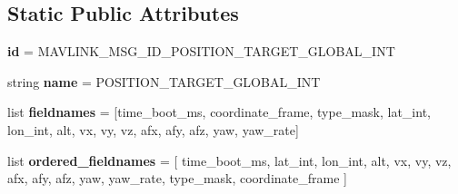 \subsection*{Static Public Attributes}
\begin{DoxyCompactItemize}
\item 
\mbox{\label{classpymavlink_1_1dialects_1_1v10_1_1MAVLink__position__target__global__int__message_ae9acef48dafa050f1e1c30083a66b1fe}} 
{\bfseries id} = M\+A\+V\+L\+I\+N\+K\+\_\+\+M\+S\+G\+\_\+\+I\+D\+\_\+\+P\+O\+S\+I\+T\+I\+O\+N\+\_\+\+T\+A\+R\+G\+E\+T\+\_\+\+G\+L\+O\+B\+A\+L\+\_\+\+I\+NT
\item 
\mbox{\label{classpymavlink_1_1dialects_1_1v10_1_1MAVLink__position__target__global__int__message_a5bde63744b3b0bd60b0f2aee91095310}} 
string {\bfseries name} = \textquotesingle{}P\+O\+S\+I\+T\+I\+O\+N\+\_\+\+T\+A\+R\+G\+E\+T\+\_\+\+G\+L\+O\+B\+A\+L\+\_\+\+I\+NT\textquotesingle{}
\item 
\mbox{\label{classpymavlink_1_1dialects_1_1v10_1_1MAVLink__position__target__global__int__message_a46365cd2740889bef3ba31401360df35}} 
list {\bfseries fieldnames} = \mbox{[}\textquotesingle{}time\+\_\+boot\+\_\+ms\textquotesingle{}, \textquotesingle{}coordinate\+\_\+frame\textquotesingle{}, \textquotesingle{}type\+\_\+mask\textquotesingle{}, \textquotesingle{}lat\+\_\+int\textquotesingle{}, \textquotesingle{}lon\+\_\+int\textquotesingle{}, \textquotesingle{}alt\textquotesingle{}, \textquotesingle{}vx\textquotesingle{}, \textquotesingle{}vy\textquotesingle{}, \textquotesingle{}vz\textquotesingle{}, \textquotesingle{}afx\textquotesingle{}, \textquotesingle{}afy\textquotesingle{}, \textquotesingle{}afz\textquotesingle{}, \textquotesingle{}yaw\textquotesingle{}, \textquotesingle{}yaw\+\_\+rate\textquotesingle{}\mbox{]}
\item 
\mbox{\label{classpymavlink_1_1dialects_1_1v10_1_1MAVLink__position__target__global__int__message_a6367bdae0b577692c31b90cc28a837af}} 
list {\bfseries ordered\+\_\+fieldnames} = \mbox{[} \textquotesingle{}time\+\_\+boot\+\_\+ms\textquotesingle{}, \textquotesingle{}lat\+\_\+int\textquotesingle{}, \textquotesingle{}lon\+\_\+int\textquotesingle{}, \textquotesingle{}alt\textquotesingle{}, \textquotesingle{}vx\textquotesingle{}, \textquotesingle{}vy\textquotesingle{}, \textquotesingle{}vz\textquotesingle{}, \textquotesingle{}afx\textquotesingle{}, \textquotesingle{}afy\textquotesingle{}, \textquotesingle{}afz\textquotesingle{}, \textquotesingle{}yaw\textquotesingle{}, \textquotesingle{}yaw\+\_\+rate\textquotesingle{}, \textquotesingle{}type\+\_\+mask\textquotesingle{}, \textquotesingle{}coordinate\+\_\+frame\textquotesingle{} \mbox{]}

\end{DoxyCompactItemize}
